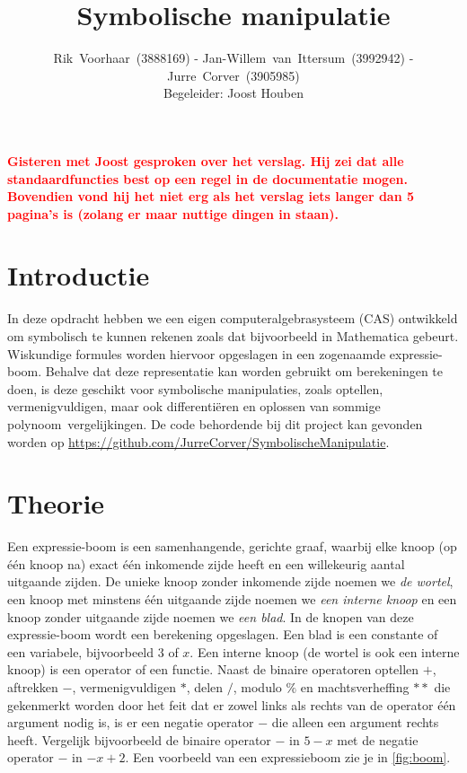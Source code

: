 \documentclass[a4paper]{article}
\title{Symbolische manipulatie}
\author{Rik~Voorhaar~(3888169) - Jan-Willem~van~Ittersum~(3992942) - Jurre~Corver~(3905985)\\
Begeleider: Joost Houben}
\newcommand{\rcom}[1]{\textbf{\textcolor{red}{#1}}}
\begin{document}
\maketitle
\clearpage


\rcom{Gisteren met Joost gesproken over het verslag. Hij zei dat alle standaardfuncties best op een regel in de documentatie mogen. Bovendien vond hij het niet erg als het verslag iets langer dan 5 pagina's is (zolang er maar nuttige dingen in staan). }

\section{Introductie}
In deze opdracht hebben we een eigen computeralgebrasysteem (CAS) ontwikkeld om symbolisch te kunnen rekenen zoals dat bijvoorbeeld in Mathematica gebeurt. Wiskundige formules worden hiervoor opgeslagen in een zogenaamde expressie-boom. Behalve dat deze representatie kan worden gebruikt om berekeningen te doen, is deze geschikt voor symbolische manipulaties, zoals optellen, vermenigvuldigen, maar ook differenti\"eren en oplossen van sommige polynoom~vergelijkingen. De code behordende bij dit project kan gevonden worden op \url{https://github.com/JurreCorver/SymbolischeManipulatie}.


\section{Theorie}
Een expressie-boom is een samenhangende, gerichte graaf, waarbij elke knoop (op \'e\'en knoop na) exact \'e\'en inkomende zijde heeft en een willekeurig aantal uitgaande zijden. De unieke knoop zonder inkomende zijde noemen we \textit{de wortel}, een knoop met minstens \'e\'en uitgaande zijde noemen we \textit{een interne knoop} en een knoop zonder uitgaande zijde noemen we \textit{een blad}. In de knopen van deze expressie-boom wordt een berekening opgeslagen. Een blad is een constante of een variabele, bijvoorbeeld $3$ of $x$. Een interne knoop (de wortel is ook een interne knoop) is een operator of een functie. Naast de binaire operatoren optellen $+$, aftrekken $-$, vermenigvuldigen $*$, delen $/$, modulo $\%$ en machtsverheffing $**$ die gekenmerkt worden door het feit dat er zowel links als rechts van de operator \'e\'en argument nodig is, is er een negatie operator $-$ die alleen een argument rechts heeft. Vergelijk bijvoorbeeld de binaire operator $-$ in $5-x$ met de negatie operator $-$ in $-x+2$. Een voorbeeld van een expressieboom zie je in \ref{fig:boom}.
\end{document}
